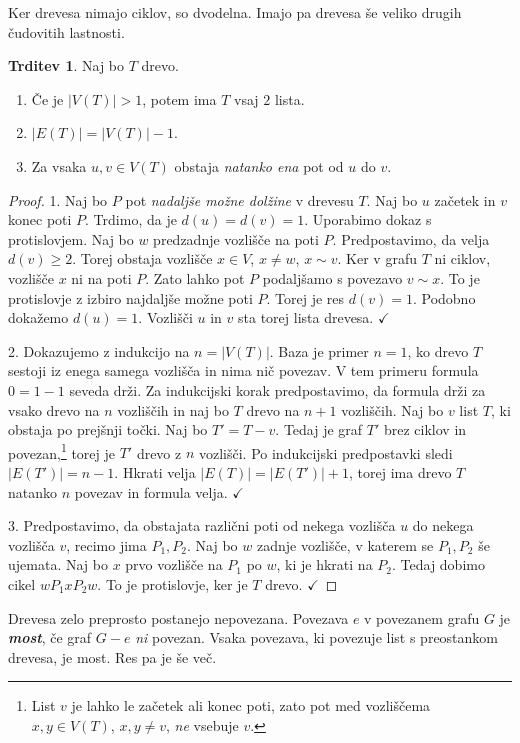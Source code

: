 \documentclass[11pt]{book}
\def\definicija{\color{rdeca}\bf\em}
\def\kljuka{$\checkmark$}
\theoremstyle{definition}
\theoremstyle{zgled}
\theoremstyle{odprtproblem}
\theoremstyle{domacanaloga}
\newenvironment{dokaz}
    {\color{siva}\begin{proof}}
    {\end{proof}}
\theoremstyle{izrek}
\newtheorem*{trditev}{Trditev}
\begin{document}
Ker drevesa nimajo ciklov, so dvodelna. Imajo pa drevesa še veliko drugih čudovitih lastnosti.

\begin{trditev}
    Naj bo $T$ drevo.
    \begin{enumerate}
        \item Če je $|V(T)| > 1$, potem ima $T$ vsaj $2$ lista.
        \item $|E(T)| = |V(T)| - 1$.
        \item Za vsaka $u,v \in V(T)$ obstaja \emph{natanko ena} pot od $u$ do $v$.
    \end{enumerate}
\end{trditev}
\begin{dokaz}
1. Naj bo $P$ pot \emph{nadaljše možne dolžine} v drevesu $T$. Naj bo $u$ začetek in $v$ konec poti $P$. Trdimo, da je $d(u) = d(v) = 1$. Uporabimo dokaz s protislovjem. Naj bo $w$ predzadnje vozlišče na poti $P$. Predpostavimo, da velja $d(v) \geq 2$. Torej obstaja vozlišče $x \in V$, $x \neq w$, $x \sim v$. Ker v grafu $T$ ni ciklov, vozlišče $x$ ni na poti $P$. Zato lahko pot $P$ podaljšamo s povezavo $v \sim x$. To je protislovje z izbiro najdaljše možne poti $P$. Torej je res $d(v) = 1$. Podobno dokažemo $d(u) = 1$. Vozlišči $u$ in $v$ sta torej lista drevesa. \kljuka

2. Dokazujemo z indukcijo na $n = |V(T)|$. Baza je primer $n = 1$, ko drevo $T$ sestoji iz enega samega vozlišča in nima nič povezav. V tem primeru formula $0 = 1 - 1$ seveda drži. Za indukcijski korak predpostavimo, da formula drži za vsako drevo na $n$ vozliščih in naj bo $T$ drevo na $n+1$ vozliščih. Naj bo $v$ list $T$, ki obstaja po prejšnji točki. Naj bo $T' = T - v$. Tedaj je graf $T'$ brez ciklov in povezan,\footnote{List $v$ je lahko le začetek ali konec poti, zato pot med vozliščema $x,y \in V(T)$, $x,y \neq v$, \emph{ne} vsebuje $v$.} torej je $T'$ drevo z $n$ vozlišči. Po indukcijski predpostavki sledi $|E(T')| = n - 1$. Hkrati velja $|E(T)| = |E(T')| + 1$, torej ima drevo $T$ natanko $n$ povezav in formula velja. \kljuka

3. Predpostavimo, da obstajata različni poti od nekega vozlišča $u$ do nekega vozlišča $v$, recimo jima $P_1, P_2$. Naj bo $w$ zadnje vozlišče, v katerem se $P_1, P_2$ še ujemata. Naj bo $x$ prvo vozlišče na $P_1$ po $w$, ki je hkrati na $P_2$. Tedaj dobimo cikel $wP_1xP_2w$. To je protislovje, ker je $T$ drevo. \kljuka
\end{dokaz}

Drevesa zelo preprosto postanejo nepovezana. Povezava $e$ v povezanem grafu $G$ je {\definicija most}, če graf $G - e$ \emph{ni} povezan. Vsaka povezava, ki povezuje list s preostankom drevesa, je most. Res pa je še več.
\end{document}
